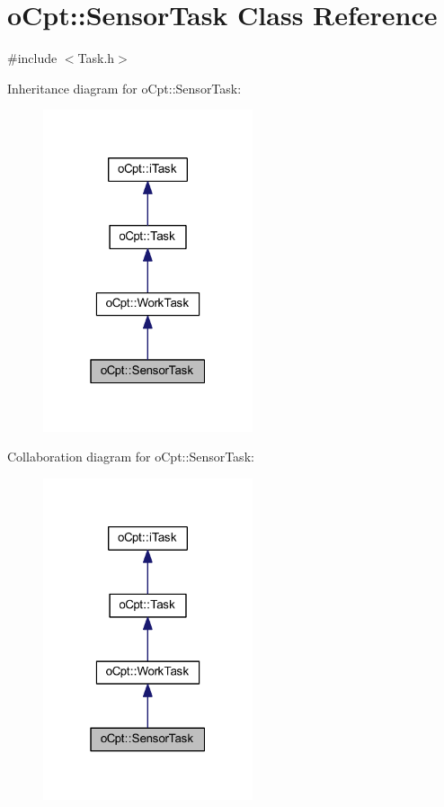 \hypertarget{classo_cpt_1_1_sensor_task}{}\section{o\+Cpt\+:\+:Sensor\+Task Class Reference}
\label{classo_cpt_1_1_sensor_task}


{\ttfamily \#include $<$Task.\+h$>$}



Inheritance diagram for o\+Cpt\+:\+:Sensor\+Task\+:\nopagebreak
\begin{figure}[H]
\begin{center}
\leavevmode
\includegraphics[width=175pt]{classo_cpt_1_1_sensor_task__inherit__graph}
\end{center}
\end{figure}


Collaboration diagram for o\+Cpt\+:\+:Sensor\+Task\+:\nopagebreak
\begin{figure}[H]
\begin{center}
\leavevmode
\includegraphics[width=175pt]{classo_cpt_1_1_sensor_task__coll__graph}
\end{center}
\end{figure}
